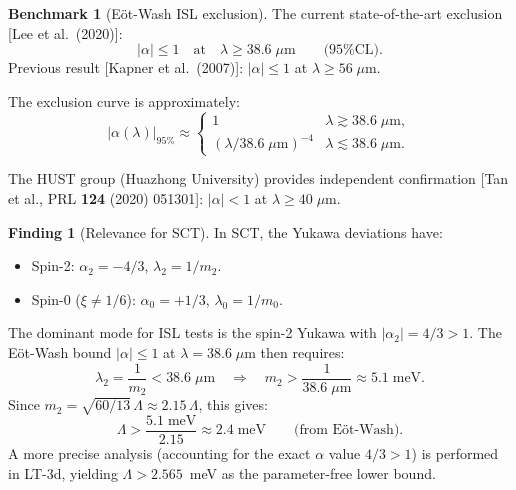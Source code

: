 \documentclass[11pt,a4paper]{article}
\theoremstyle{plain}
\theoremstyle{definition}
\newtheorem{benchmark}[theorem]{Benchmark}
\newtheorem{finding}[theorem]{Finding}
\theoremstyle{remark}
\newcommand{\fromlit}[1]{\textcolor{sctblue}{\textsf{[#1]}}}
\begin{document}
\begin{benchmark}[E\"ot-Wash ISL exclusion]\label{bench:eotwash}
The current state-of-the-art exclusion
\fromlit{Lee et al.\ (2020)}:
\begin{equation}\label{eq:eotwash}
  |\alpha| \leq 1 \quad\text{at}\quad
  \lambda \geq 38.6\;\mu\mathrm{m}
  \qquad\text{(95\% CL)}.
\end{equation}
Previous result \fromlit{Kapner et al.\ (2007)}:
$|\alpha| \leq 1$ at $\lambda \geq 56\;\mu$m.
\end{benchmark}

\noindent The exclusion curve is approximately:
\begin{equation}\label{eq:eotwash-curve}
  |\alpha(\lambda)|_{\text{95\%}} \approx
  \begin{cases}
    1 & \lambda \gtrsim 38.6\;\mu\text{m},\\
    (\lambda / 38.6\;\mu\text{m})^{-4} & \lambda \lesssim 38.6\;\mu\text{m}.
  \end{cases}
\end{equation}

The HUST group (Huazhong University) provides independent
confirmation \fromlit{Tan et al., PRL \textbf{124} (2020) 051301}:
$|\alpha| < 1$ at $\lambda \geq 40\;\mu$m.

\begin{finding}[Relevance for SCT]\label{find:eotwash-sct}
In SCT, the Yukawa deviations have:
\begin{itemize}[nosep]
  \item Spin-2: $\alpha_2 = -4/3$, $\lambda_2 = 1/m_2$.
  \item Spin-0 ($\xi \neq 1/6$): $\alpha_0 = +1/3$, $\lambda_0 = 1/m_0$.
\end{itemize}
The dominant mode for ISL tests is the spin-2 Yukawa with
$|\alpha_2| = 4/3 > 1$.  The E\"ot-Wash bound $|\alpha| \leq 1$
at $\lambda = 38.6\;\mu$m then requires:
\begin{equation}\label{eq:lambda-bound}
  \lambda_2 = \frac{1}{m_2} < 38.6\;\mu\mathrm{m}
  \quad\Longrightarrow\quad
  m_2 > \frac{1}{38.6\;\mu\mathrm{m}}
  \approx 5.1\;\mathrm{meV}.
\end{equation}
Since $m_2 = \sqrt{60/13}\,\Lambda \approx 2.15\,\Lambda$, this
gives:
\begin{equation}\label{eq:Lambda-bound}
  \Lambda > \frac{5.1\;\mathrm{meV}}{2.15}
  \approx 2.4\;\mathrm{meV}
  \qquad\text{(from E\"ot-Wash)}.
\end{equation}
A more precise analysis (accounting for the exact $\alpha$ value
$4/3 > 1$) is performed in LT-3d, yielding
$\Lambda > 2.565$~meV as the parameter-free lower bound.
\end{finding}
\end{document}
